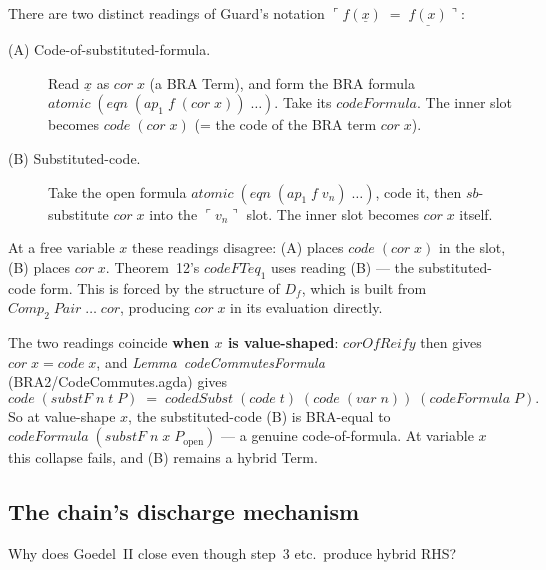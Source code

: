 \documentclass[11pt]{article}
\begin{document}
There are two distinct readings of Guard's notation
$\ulcorner f(\underline{x}) \;=\; \underline{f(x)} \urcorner$:

\begin{description}
  \item[(A) Code-of-substituted-formula.]  Read $\underline{x}$ as
    $\mathit{cor}\;x$ (a BRA Term), and form the BRA formula
    $\mathit{atomic}\;(\mathit{eqn}\;(\mathit{ap}_1\;f\;(\mathit{cor}\;x))\;\dots)$.
    Take its $\mathit{codeFormula}$.
    The inner slot becomes $\mathit{code}\;(\mathit{cor}\;x)$
    (= the code of the BRA term $\mathit{cor}\;x$).
  \item[(B) Substituted-code.]  Take the open formula
    $\mathit{atomic}\;(\mathit{eqn}\;(\mathit{ap}_1\;f\;v_n)\;\dots)$,
    code it, then $\mathit{sb}$-substitute $\mathit{cor}\;x$ into the
    $\ulcorner v_n\urcorner$ slot.  The inner slot becomes
    $\mathit{cor}\;x$ itself.
\end{description}
At a free variable $x$ these readings disagree: (A) places
$\mathit{code}\;(\mathit{cor}\;x)$ in the slot, (B) places
$\mathit{cor}\;x$.  Theorem~12's $\mathit{codeFTeq}_1$ uses reading
(B) --- the substituted-code form.  This is forced by the structure of
$D_f$, which is built from $\mathit{Comp}_2\;\mathit{Pair}\;\dots\;\mathit{cor}$,
producing $\mathit{cor}\;x$ in its evaluation directly.

The two readings coincide \textbf{when $x$ is value-shaped}:
$\mathit{corOfReify}$ then gives
$\mathit{cor}\;x = \mathit{code}\;x$, and \emph{Lemma~codeCommutesFormula}
(BRA2/CodeCommutes.agda) gives
\[
  \mathit{code}\;(\mathit{substF}\;n\;t\;P) \;=\;
   \mathit{codedSubst}\;(\mathit{code}\;t)\;(\mathit{code}\;(\mathit{var}\;n))\;(\mathit{codeFormula}\;P).
\]
So at value-shape $x$, the substituted-code (B) is BRA-equal to
$\mathit{codeFormula}\;(\mathit{substF}\;n\;x\;P_{\mathrm{open}})$ ---
a genuine code-of-formula.  At variable $x$ this collapse fails, and
(B) remains a hybrid Term.

\subsection{The chain's discharge mechanism}

Why does Goedel~II close even though step~3 etc.\ produce hybrid RHS?
\end{document}
